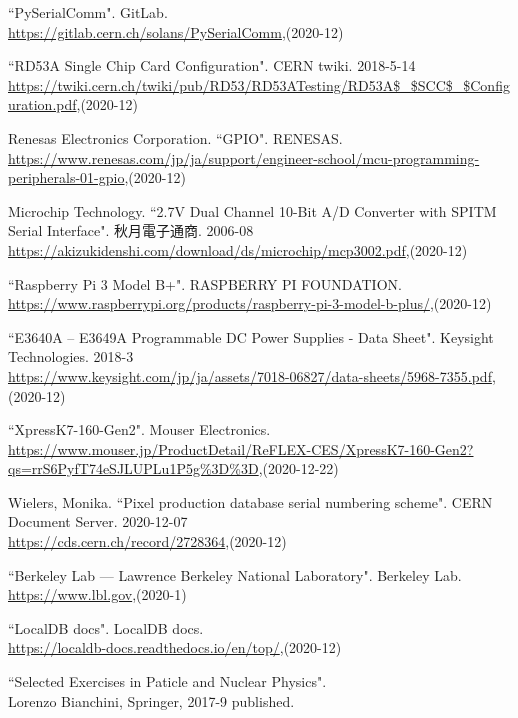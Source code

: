 \begin{thebibliography}{9}
``PySerialComm". GitLab. \\
\url{https://gitlab.cern.ch/solans/PySerialComm},(2020-12)

``RD53A Single Chip Card Configuration". CERN twiki. 2018-5-14 \\
\url{https://twiki.cern.ch/twiki/pub/RD53/RD53ATesting/RD53A$\_$SCC$\_$Configuration.pdf},(2020-12)

Renesas Electronics Corporation. ``GPIO". RENESAS.  \\
\url{https://www.renesas.com/jp/ja/support/engineer-school/mcu-programming-peripherals-01-gpio},(2020-12)

Microchip Technology. ``2.7V Dual Channel 10-Bit A/D Converter with SPITM Serial Interface". 秋月電子通商. 2006-08\\
\url{https://akizukidenshi.com/download/ds/microchip/mcp3002.pdf},(2020-12)

``Raspberry Pi 3 Model B+". RASPBERRY PI FOUNDATION. \\
\url{https://www.raspberrypi.org/products/raspberry-pi-3-model-b-plus/},(2020-12)

``E3640A – E3649A Programmable DC Power Supplies - Data Sheet". Keysight Technologies. 2018-3\\
\url{https://www.keysight.com/jp/ja/assets/7018-06827/data-sheets/5968-7355.pdf},(2020-12)

``XpressK7-160-Gen2". Mouser Electronics.\\
\url{https://www.mouser.jp/ProductDetail/ReFLEX-CES/XpressK7-160-Gen2?qs=rrS6PyfT74eSJLUPLu1P5g\%3D\%3D},(2020-12-22)

Wielers, Monika. ``Pixel production database serial numbering scheme". CERN Document Server. 2020-12-07\\
\url{https://cds.cern.ch/record/2728364},(2020-12)

``Berkeley Lab — Lawrence Berkeley National Laboratory". Berkeley Lab. \\
\url{https://www.lbl.gov},(2020-1)

``LocalDB docs". LocalDB docs. \\
\url{https://localdb-docs.readthedocs.io/en/top/},(2020-12)

``Selected Exercises in Paticle and Nuclear Physics".\\
Lorenzo Bianchini, Springer, 2017-9 published.


\end{thebibliography}
